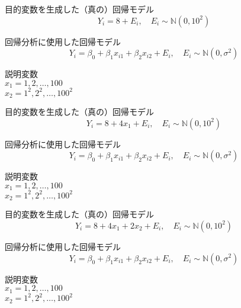 {
  目的変数を生成した（真の）回帰モデル
  \blue
  {
    \[Y_i= 8 + E_i, \quad E_i\sim \mathbb{N}(0, 10^2)\]
  }

  回帰分析に使用した回帰モデル
  \[Y_i=\beta_0+\beta_1 x_{i1}+\beta_2 x_{i2}+E_i,\quad E_i\sim \mathbb{N}(0,\sigma^2)\]

  説明変数\\
  $x_1 = 1, 2, \dots, 100$\\
  $x_2 = 1^2, 2^2, \dots, 100^2$
}

{
  \small
  
}

{
  目的変数を生成した（真の）回帰モデル
  \blue
  {
    \[Y_i= 8 + 4 x_1 + E_i, \quad E_i\sim \mathbb{N}(0, 10^2)\]
  }

  回帰分析に使用した回帰モデル
  \[Y_i=\beta_0+\beta_1 x_{i1}+\beta_2 x_{i2}+E_i,\quad E_i\sim \mathbb{N}(0,\sigma^2)\]

  説明変数\\
  $x_1 = 1, 2, \dots, 100$\\
  $x_2 = 1^2, 2^2, \dots, 100^2$
}

{
  \small
  
}

{
  目的変数を生成した（真の）回帰モデル
  \blue
  {
    \[Y_i= 8 + 4 x_1 + 2 x_2 + E_i, \quad E_i\sim \mathbb{N}(0, 10^2)\]
  }

  回帰分析に使用した回帰モデル
  \[Y_i=\beta_0+\beta_1 x_{i1}+\beta_2 x_{i2}+E_i,\quad E_i\sim \mathbb{N}(0,\sigma^2)\]

  説明変数\\
  $x_1 = 1, 2, \dots, 100$\\
  $x_2 = 1^2, 2^2, \dots, 100^2$
}

%
%
%


